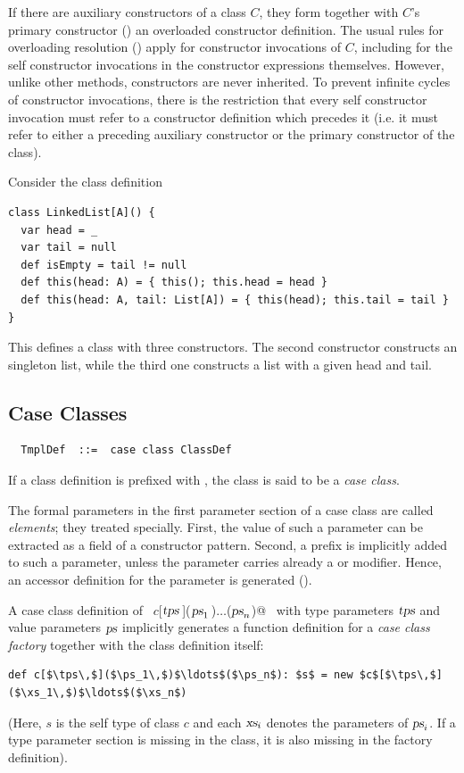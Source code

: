 If there are auxiliary constructors of a class $C$, they form together
with $C$'s primary constructor ()
an overloaded constructor
definition. The usual rules for overloading resolution
() apply for constructor invocations of $C$,
including for the self constructor invocations in the constructor
expressions themselves. However, unlike other methods, constructors
are never inherited.  To prevent infinite cycles of constructor
invocations, there is the restriction that every self constructor
invocation must refer to a constructor definition which precedes it
(i.e. it must refer to either a preceding auxiliary constructor or the
primary constructor of the class).  

\example Consider the class definition

\begin{lstlisting}
class LinkedList[A]() {
  var head = _ 
  var tail = null 
  def isEmpty = tail != null   
  def this(head: A) = { this(); this.head = head }
  def this(head: A, tail: List[A]) = { this(head); this.tail = tail }
}
\end{lstlisting}
This defines a class  with three constructors.  The
second constructor constructs an singleton list, while the
third one constructs a list with a given head and tail.

\subsection{Case Classes}
\label{sec:case-classes}

\syntax\begin{lstlisting} 
  TmplDef  ::=  case class ClassDef
\end{lstlisting}

If a class definition is prefixed with , the class is said
to be a {\em case class}.  

The formal parameters in the first parameter section of a case class
are called {\em elements}; they treated
specially. First, the value of such a parameter can be extracted as a
field of a constructor pattern. Second, a  prefix is
implicitly added to such a parameter, unless the parameter carries
already a  or  modifier. Hence, an accessor
definition for the parameter is generated ().

A case class definition of ~\lstinline@$c$[$\mbox{\sl tps}\,$]($\mbox{\sl ps}_1\,$)$\ldots$($\mbox{\sl ps}_n$)@~ with type
parameters $\mbox{\sl tps}$ and value parameters $\mbox{\sl ps}$ implicitly
generates a function definition for a {\em case class factory}
together with the class definition itself:
\begin{lstlisting}
def c[$\tps\,$]($\ps_1\,$)$\ldots$($\ps_n$): $s$ = new $c$[$\tps\,$]($\xs_1\,$)$\ldots$($\xs_n$)
\end{lstlisting}
(Here, $s$ is the self type of class $c$ and each $\mbox{\sl xs}_i$ denotes the
parameters of $\mbox{\sl ps}_i$.  If a type parameter section is missing in the
class, it is also missing in the factory definition).

